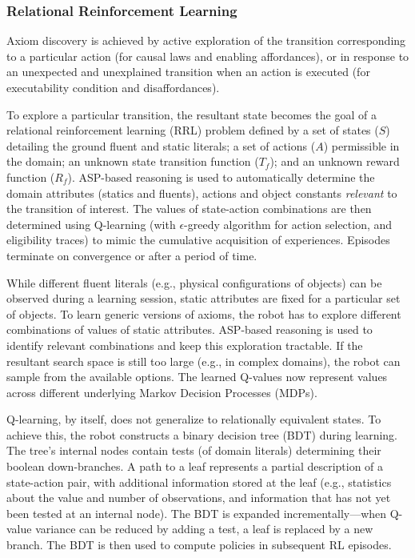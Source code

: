 \documentclass{article}
\begin{document}
\subsubsection{Relational Reinforcement Learning}
Axiom discovery is achieved by active exploration of the transition
corresponding to a particular action (for causal laws and enabling
affordances), or in response to an unexpected and unexplained
transition when an action is executed (for executability condition and
disaffordances).


To explore a particular transition, the resultant state becomes the
goal of a relational reinforcement learning (RRL) problem defined by a
set of states ($S$) detailing the ground fluent and static literals; a
set of actions ($A$) permissible in the domain; an unknown state
transition function ($T_f$); and an unknown reward function ($R_f$).
ASP-based reasoning is used to automatically determine the domain
attributes (statics and fluents), actions and object constants
\emph{relevant} to the transition of interest.  The values of
state-action combinations are then determined using Q-learning (with
$\epsilon$-greedy algorithm for action selection, and eligibility
traces) to mimic the cumulative acquisition of experiences. Episodes
terminate on convergence or after a period of time.

While different fluent literals (e.g., physical configurations of
objects) can be observed during a learning session, static attributes
are fixed for a particular set of objects. To learn generic versions
of axioms, the robot has to explore different combinations of values
of static attributes. ASP-based reasoning is used to identify relevant
combinations and keep this exploration tractable. If the resultant
search space is still too large (e.g., in complex domains), the robot
can sample from the available options. The learned Q-values now
represent values across different underlying Markov Decision Processes
(MDPs).


Q-learning, by itself, does not generalize to relationally equivalent
states.  To achieve this, the robot constructs a binary decision tree
(BDT) during learning.  The tree's internal nodes contain tests (of
domain literals) determining their boolean down-branches. A path to a
leaf represents a partial description of a state-action pair, with
additional information stored at the leaf (e.g., statistics about the
value and number of observations, and information that has not yet
been tested at an internal node).  The BDT is expanded
incrementally---when Q-value variance can be reduced by adding a test,
a leaf is replaced by a new branch. The BDT is then used to compute
policies in subsequent RL episodes.
\end{document}

